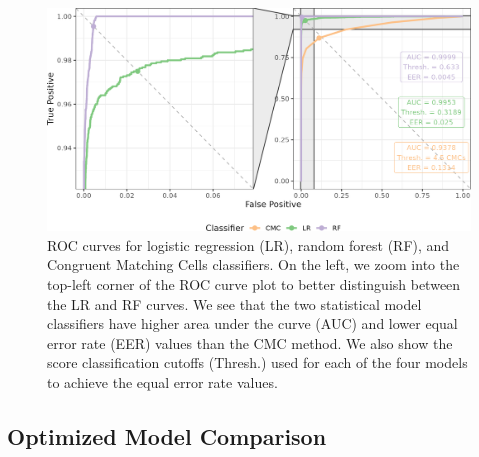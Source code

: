 \documentclass[reprint]{JASA}
\begin{document}
\begin{figure}[htbp]

{\centering \includegraphics[width=\textwidth]{images/resultsPlots/rocPlot} 

}

\caption{ROC curves for logistic regression (LR), random forest (RF), and Congruent Matching Cells classifiers. On the left, we zoom into the top-left corner of the ROC curve plot to better distinguish between the LR and RF curves. We see that the two statistical model classifiers have higher area under the curve (AUC) and lower equal error rate (EER) values than the CMC method. We also show the score classification cutoffs (Thresh.) used for each of the four models to achieve the equal error rate values.}\label{fig:rocPlot}
\end{figure}

\hypertarget{optimized-model-comparison}{%
\subsection{Optimized Model
Comparison}\label{optimized-model-comparison}}
\end{document}
